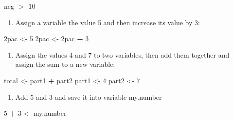 \documentclass[
]{book}
\newenvironment{Shaded}{\begin{snugshade}}{\end{snugshade}}
\newcommand{\DecValTok}[1]{\textcolor[rgb]{0.00,0.00,0.81}{#1}}
\newcommand{\NormalTok}[1]{#1}
\newcommand{\OperatorTok}[1]{\textcolor[rgb]{0.81,0.36,0.00}{\textbf{#1}}}
\newcommand{\StringTok}[1]{\textcolor[rgb]{0.31,0.60,0.02}{#1}}
\providecommand{\tightlist}{%
  \setlength{\itemsep}{0pt}\setlength{\parskip}{0pt}}
\begin{document}
\begin{Shaded}
\begin{Highlighting}[]
\NormalTok{neg {-}\textgreater{}}\StringTok{ }\DecValTok{{-}10}
\end{Highlighting}
\end{Shaded}

\begin{enumerate}
\def\labelenumi{\arabic{enumi}.}
\setcounter{enumi}{1}
\tightlist
\item
  Assign a variable the value 5 and then increase its value by 3:
\end{enumerate}

\begin{Shaded}
\begin{Highlighting}[]
\NormalTok{2pac \textless{}{-}}\StringTok{ }\DecValTok{5}
\NormalTok{2pac \textless{}{-}}\StringTok{ }\NormalTok{2pac }\OperatorTok{+}\StringTok{ }\DecValTok{3}
\end{Highlighting}
\end{Shaded}

\begin{enumerate}
\def\labelenumi{\arabic{enumi}.}
\setcounter{enumi}{2}
\tightlist
\item
  Assign the values 4 and 7 to two variables, then add them together and assign the sum to a new variable:
\end{enumerate}

\begin{Shaded}
\begin{Highlighting}[]
\NormalTok{total \textless{}{-}}\StringTok{ }\NormalTok{part1 }\OperatorTok{+}\StringTok{ }\NormalTok{part2}
\NormalTok{part1 \textless{}{-}}\StringTok{ }\DecValTok{4}
\NormalTok{part2 \textless{}{-}}\StringTok{ }\DecValTok{7}
\end{Highlighting}
\end{Shaded}

\begin{enumerate}
\def\labelenumi{\arabic{enumi}.}
\setcounter{enumi}{3}
\tightlist
\item
  Add 5 and 3 and save it into variable my.number
\end{enumerate}

\begin{Shaded}
\begin{Highlighting}[]
\DecValTok{5} \OperatorTok{+}\StringTok{ }\DecValTok{3}\NormalTok{ \textless{}{-}}\StringTok{ }\NormalTok{my.number}
\end{Highlighting}
\end{Shaded}
\end{document}
